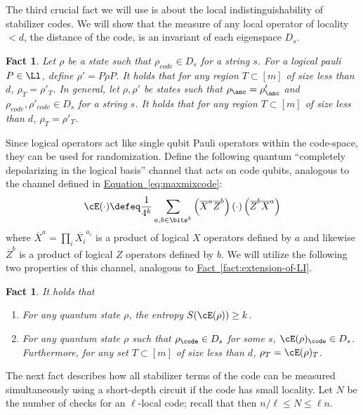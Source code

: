 \documentclass[11pt]{article}
\newcommand{\expref}[2]{\texorpdfstring{\hyperref[#2]{#1~\ref{#2}}}{#1~\ref{#2}}}
\newcommand{\expeqref}[2]{\texorpdfstring{\hyperref[#2]{#1~\eqref{#2}}}{#1~\eqref{#2}}}
\newtheorem{fact}[theorem]{Fact}
\begin{document}
The third crucial fact we will use is about the local indistinguishability of stabilizer codes. We will show that the measure of any local operator of locality $< d$, the distance of the code, is an invariant of each eigenspace $D_s$.

\begin{fact}
\label{fact:samemarginals}
Let $\rho$ be a state such that $\rho_{code}\in D_s$ for a string $s$. For a logical pauli $P\in \Ll$, define $\rho'=P\rho P$. It holds that for any region $T\subset [m]$ of size less than $d$, $\rho_T=\rho'_T$.
In general, let $\rho, \rho'$ be states such that $\rho_{\anc}=\rho'_{\anc}$ and $\rho_{code}, \rho'_{code}\in D_s$ for a string $s$. It holds that for any region $T\subset [m]$ of size less than $d$, $\rho_T=\rho'_T$.
\end{fact}

%

Since logical operators act like single qubit Pauli operators within the code-space, they can be used for randomization. %
Define the following quantum ``completely depolarizing in the logical basis'' channel that acts on code qubits, analogous to the channel defined in \expeqref{Equation}{eq:maxmixcode}:
\begin{align}
\label{eq:randomizer}
\cE(\cdot) \defeq \frac{1}{4^{k}} \sum_{a,b \in \bits^{k}} \left( \overline{X}^a \overline{Z}^b \right)(\cdot)\left( \overline{Z}^b\overline{X}^a  \right)
%
\end{align}
where $\overline{X}^a = \prod_i \overline{X_i}^{a_i}$ is a product of logical $X$ operators defined by $a$ and likewise $\overline{Z}^b$ is a product of logical $Z$ operators defined by $b$.
%
We will utilize the following two properties of this channel, analogous to \expref{Fact}{fact:extension-of-LI}.
\begin{fact}
\label{fact:Eprop}
It holds that
\begin{enumerate}
    \item For any quantum state $\rho$, the entropy $S(\cE(\rho))\geq k$.
    \item For any quantum state $\rho$ such that $\rho_{\code}\in D_s$ for some $s$, $\cE(\rho)_{\code}\in D_s$. Furthermore, for any set $T\subset [m]$ of size less than $d$, $\rho_T=\cE(\rho)_T$.
\end{enumerate}
\end{fact}

The next fact describes how all stabilizer terms of the code can be measured simultaneously using a short-depth circuit if the code has small locality. Let $N$ be the number of checks for an $\ell$-local code; recall that then $n/\ell \leq N \leq \ell n$.
\end{document}
